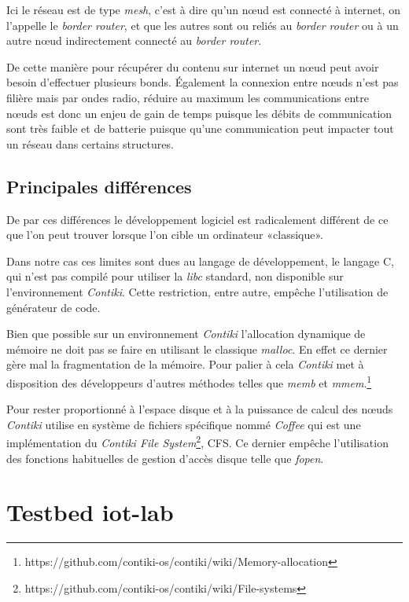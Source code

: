 Ici le réseau est de type \emph{mesh}, c'est à dire qu'un nœud est connecté à internet, on l'appelle le \emph{border router}, et que les autres sont ou reliés au \emph{border router} ou à un autre nœud indirectement connecté au \emph{border router}.


De cette manière pour récupérer du contenu sur internet un nœud peut avoir besoin d'effectuer plusieurs bonds. Également la connexion entre nœuds n'est pas filière mais par ondes radio, réduire au maximum les communications entre nœuds est donc un enjeu de gain de temps puisque les débits de communication sont très faible et de batterie puisque qu'une communication peut impacter tout un réseau dans certains structures.

\subsection{Principales différences}

De par ces différences le développement logiciel est radicalement différent de ce que l'on peut trouver lorsque l'on cible un ordinateur «classique».

Dans notre cas ces limites sont dues au langage de développement, le langage C, qui n'est pas compilé pour utiliser la \emph{libc} standard, non disponible sur l'environnement \emph{Contiki}. Cette restriction, entre autre, empêche l'utilisation de générateur de code.

Bien que possible sur un environnement \emph{Contiki} l'allocation dynamique de mémoire ne doit pas se faire en utilisant le classique \emph{malloc}. En effet ce dernier gère mal la fragmentation de la mémoire. Pour palier à cela \emph{Contiki} met à disposition des développeurs d'autres méthodes telles que \emph{memb} et \emph{mmem}.\footnote{https://github.com/contiki-os/contiki/wiki/Memory-allocation}

Pour rester proportionné à l'espace disque et à la puissance de calcul des nœuds \emph{Contiki} utilise en système de fichiers spécifique nommé \emph{Coffee} qui est une  implémentation du \emph{Contiki File System}\footnote{https://github.com/contiki-os/contiki/wiki/File-systems}, CFS. Ce dernier empêche l'utilisation des fonctions habituelles de gestion d'accès disque telle que \emph{fopen}.


\section{Testbed iot-lab}


